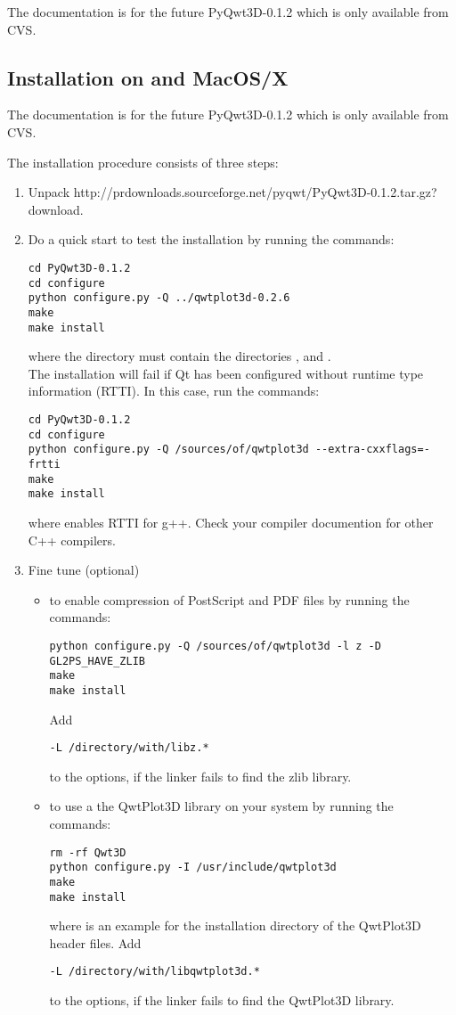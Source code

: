 \documentclass{manual}
\newcommand{\PyQwtDddTarGz}{\ulink{PyQwt3D-0.1.2.tar.gz}
  {http://prdownloads.sourceforge.net/pyqwt/PyQwt3D-0.1.2.tar.gz?download}}
\newcommand{\Future}{
  \begin{notice}[warning]
    The documentation is for the future PyQwt3D-0.1.2 which is only available
    from CVS.
  \end{notice}
}
\begin{document}
\Future{}

\subsection{Installation on \POSIX{} and MacOS/X\label{posix-install}}

\Future{}

The installation procedure consists of three steps:
\begin{enumerate}
\item
  Unpack \PyQwtDddTarGz{}.
\item
  Do a quick start to test the installation by running the commands:
\begin{verbatim}
cd PyQwt3D-0.1.2
cd configure
python configure.py -Q ../qwtplot3d-0.2.6
make
make install
\end{verbatim}
  where the directory
   must contain the directories ,
   and .\\
  The installation will fail if Qt has been configured without runtime type
  information (RTTI).  In this case, run the commands:
\begin{verbatim}
cd PyQwt3D-0.1.2
cd configure
python configure.py -Q /sources/of/qwtplot3d --extra-cxxflags=-frtti
make
make install
\end{verbatim}
  where  enables RTTI for g++.  Check your compiler documention
  for other C++ compilers.
\item
  Fine tune (optional)
  \begin{itemize}
    \item
      to enable compression of PostScript and PDF files by running the
      commands:
\begin{verbatim}
python configure.py -Q /sources/of/qwtplot3d -l z -D GL2PS_HAVE_ZLIB
make
make install
\end{verbatim}
      Add
\begin{verbatim}
-L /directory/with/libz.*
\end{verbatim}
      to the  options, if the linker fails to find the zlib
      library.
    \item
      to use a the QwtPlot3D library on your system by running the commands:
\begin{verbatim}
rm -rf Qwt3D
python configure.py -I /usr/include/qwtplot3d
make
make install
\end{verbatim}
      where  is an example for the installation
      directory of the QwtPlot3D header files.
      Add
\begin{verbatim}
-L /directory/with/libqwtplot3d.*
\end{verbatim}
      to the  options, if the linker fails to find the
      QwtPlot3D library.
  \end{itemize}
\end{enumerate}
\end{document}
